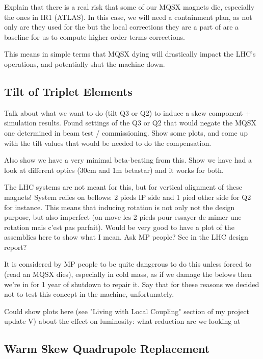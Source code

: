 Explain that there is a real risk that some of our MQSX magnets die, especially the ones in IR1 (ATLAS).
In this case, we will need a containment plan, as not only are they used for the but the local corrections they are a part of are a baseline for us to compute higher order terms corrections.


This means in simple terms that MQSX dying will drastically impact the LHC's operations, and potentially shut the machine down.

\subsection{Tilt of Triplet Elements}

Talk about what we want to do (tilt Q3 or Q2) to induce a skew component + simulation results.
Found settings of the Q3 or Q2 that would negate the MQSX one determined in beam test / commissioning.
Show some plots, and come up with the tilt values that would be needed to do the compensation.

Also show we have a very minimal beta-beating from this.
Show we have had a look at different optics (30cm and 1m betastar) and it works for both.


The LHC systems are not meant for this, but for vertical alignment of these magnets!
System relies on bellows: 2 pieds IP side and 1 pied other side for Q2 for instance.
This means that inducing rotation is not only not the design purpose, but also imperfect (on move les 2 pieds pour essayer de mimer une rotation mais c'est pas parfait).
Would be very good to have a plot of the assemblies here to show what I mean. Ask MP people? See in the LHC design report?

It is considered by MP people to be quite dangerous to do this unless forced to (read an MQSX dies), especially in cold mass, as if we damage the belows then we're in for 1 year of shutdown to repair it.
Say that for these reasons we decided not to test this concept in the machine, unfortunately.

Could show plots here (see "Living with Local Coupling" section of my project update V) about the effect on luminosity: what reduction are we looking at 

\subsection{Warm Skew Quadrupole Replacement}


